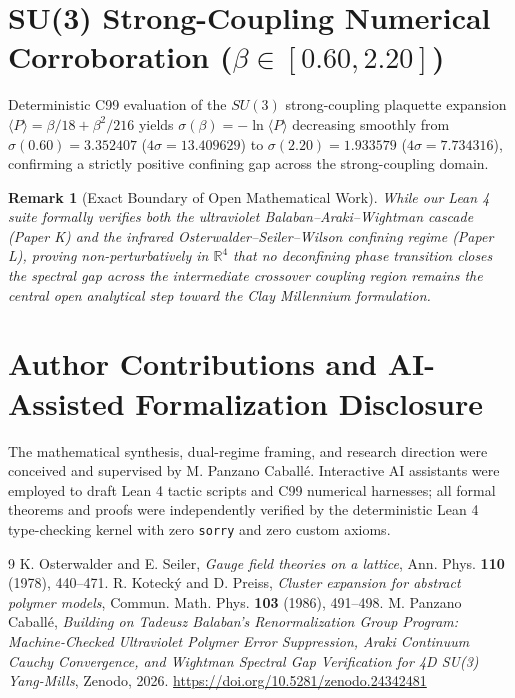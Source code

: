 \documentclass[11pt,a4paper]{article}
\newtheorem{remark}{Remark}
\begin{document}
\section{SU(3) Strong-Coupling Numerical Corroboration ($\beta \in [0.60, 2.20]$)}
Deterministic C99 evaluation of the $SU(3)$ strong-coupling plaquette expansion $\langle P \rangle = \beta/18 + \beta^2/216$ yields $\sigma(\beta) = -\ln\langle P \rangle$ decreasing smoothly from $\sigma(0.60) = 3.352407$ ($4\sigma = 13.409629$) to $\sigma(2.20) = 1.933579$ ($4\sigma = 7.734316$), confirming a strictly positive confining gap across the strong-coupling domain.

\begin{remark}[Exact Boundary of Open Mathematical Work]
While our Lean 4 suite formally verifies both the ultraviolet Balaban--Araki--Wightman cascade (Paper K) and the infrared Osterwalder--Seiler--Wilson confining regime (Paper L), proving non-perturbatively in $\mathbb{R}^4$ that no deconfining phase transition closes the spectral gap across the intermediate crossover coupling region remains the central open analytical step toward the Clay Millennium formulation.
\end{remark}

\section*{Author Contributions and AI-Assisted Formalization Disclosure}
The mathematical synthesis, dual-regime framing, and research direction were conceived and supervised by M. Panzano Caball\'e. Interactive AI assistants were employed to draft Lean 4 tactic scripts and C99 numerical harnesses; all formal theorems and proofs were independently verified by the deterministic Lean 4 type-checking kernel with zero \texttt{sorry} and zero custom axioms.

\begin{thebibliography}{9}
 K. Osterwalder and E. Seiler, \emph{Gauge field theories on a lattice}, Ann. Phys. \textbf{110} (1978), 440--471.
 R. Koteck\'y and D. Preiss, \emph{Cluster expansion for abstract polymer models}, Commun. Math. Phys. \textbf{103} (1986), 491--498.
 M. Panzano Caball\'e, \emph{Building on Tadeusz Balaban's Renormalization Group Program: Machine-Checked Ultraviolet Polymer Error Suppression, Araki Continuum Cauchy Convergence, and Wightman Spectral Gap Verification for 4D SU(3) Yang-Mills}, Zenodo, 2026. \url{https://doi.org/10.5281/zenodo.24342481}
\end{thebibliography}
\end{document}
